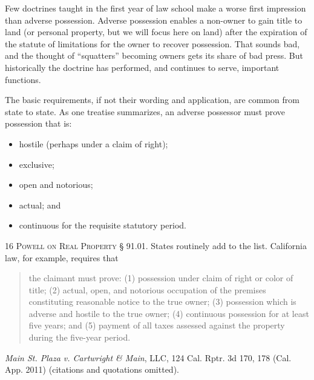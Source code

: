 Few doctrines taught in the first year of law school make a worse first
impression than adverse possession. Adverse possession enables a non-owner to
gain title to land (or personal property, but we will focus here on land) after
the expiration of the statute of limitations for the owner to recover
possession. That sounds bad, and the thought of ``squatters'' becoming owners
gets its share of bad press. But historically the doctrine has performed, and
continues to serve, important functions. 

The basic requirements, if not their wording and application, are common from
state to state. As one treatise summarizes, an adverse possessor must prove
possession that is:
\begin{itemize}
\item hostile (perhaps under a claim of right);

\item exclusive;

\item open and notorious;

\item actual; and

\item continuous for the requisite statutory period.
\end{itemize}
16 \textsc{Powell on Real Property} {\S} 91.01. States routinely add to the
list. California law, for example, requires that 
\begin{quote}
the claimant must prove: (1) possession under claim of right or color of title;
(2) actual, open, and notorious occupation of the premises constituting
reasonable notice to the true owner; (3) possession which is adverse and
hostile to the true owner; (4) continuous possession for at least five years;
and (5) payment of all taxes assessed against the property during the five-year
period.
\end{quote}
\emph{Main St. Plaza v. Cartwright \& Main}, LLC, 124 Cal. Rptr. 3d 170, 178
(Cal. App. 2011) (citations and quotations omitted).


